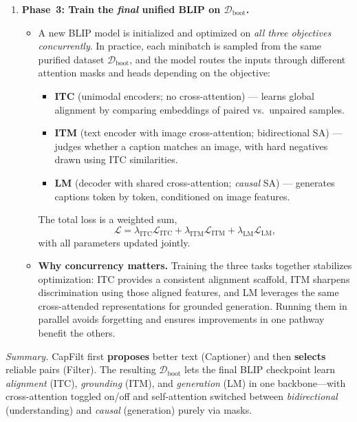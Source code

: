 \begin{enrichment}
\begin{enrichment}
\begin{enumerate}
            \item \textbf{Phase~3: Train the \emph{final} unified BLIP on $\mathcal{D}_{\mathrm{boot}}$.}
            \begin{itemize}
                \item A new BLIP model is initialized and optimized on \emph{all three objectives concurrently}. In practice, each minibatch is sampled from the same purified dataset $\mathcal{D}_{\mathrm{boot}}$, and the model routes the inputs through different attention masks and heads depending on the objective:
                \begin{itemize}
                    \item \textbf{ITC} (unimodal encoders; no cross-attention) — learns global alignment by comparing embeddings of paired vs.\ unpaired samples.
                    \item \textbf{ITM} (text encoder with image cross-attention; bidirectional SA) — judges whether a caption matches an image, with hard negatives drawn using ITC similarities.
                    \item \textbf{LM} (decoder with shared cross-attention; \emph{causal} SA) — generates captions token by token, conditioned on image features.
                \end{itemize}
                The total loss is a weighted sum,
                \[
                \mathcal{L} = \lambda_{\mathrm{ITC}} \mathcal{L}_{\mathrm{ITC}} 
                + \lambda_{\mathrm{ITM}} \mathcal{L}_{\mathrm{ITM}}
                + \lambda_{\mathrm{LM}} \mathcal{L}_{\mathrm{LM}},
                \]
                with all parameters updated jointly.
                \item \textbf{Why concurrency matters.} Training the three tasks together stabilizes optimization: ITC provides a consistent alignment scaffold, ITM sharpens discrimination using those aligned features, and LM leverages the same cross-attended representations for grounded generation. Running them in parallel avoids forgetting and ensures improvements in one pathway benefit the others.
            \end{itemize}
        \end{enumerate}
        
        \emph{Summary.} CapFilt first \textbf{proposes} better text (Captioner) and then \textbf{selects} reliable pairs (Filter). The resulting $\mathcal{D}_{\mathrm{boot}}$ lets the final BLIP checkpoint learn \emph{alignment} (ITC), \emph{grounding} (ITM), and \emph{generation} (LM) in one backbone—with cross-attention toggled on/off and self-attention switched between \emph{bidirectional} (understanding) and \emph{causal} (generation) purely via masks.
        

\end{enrichment}
\end{enrichment}
